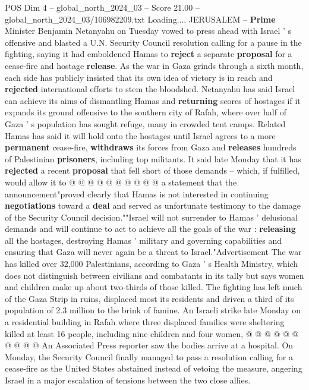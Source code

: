 \begin{textsample}{POS Dim 4 – global\_north\_2024\_03 – Score 21.00 – global\_north\_2024\_03/106982209.txt}  \label{ex:f4_pos_242}
Loading....
JERUSALEM -- \textbf{Prime} Minister Benjamin Netanyahu on Tuesday vowed to press ahead with Israel ' s offensive and blasted a U.N.
Security Council resolution calling for a pause in the fighting, saying it had emboldened Hamas to \textbf{reject} a separate \textbf{proposal} for a cease-fire and hostage \textbf{release}.
As the war in Gaza grinds through a sixth month, each side has publicly insisted that its own idea of victory is in reach and \textbf{rejected} international efforts to stem the bloodshed.
Netanyahu has said Israel can achieve its aims of dismantling Hamas and \textbf{returning} scores of hostages if it expands its ground offensive to the southern city of Rafah, where over half of Gaza ' s population has sought refuge, many in crowded tent camps.
Related Hamas has said it will hold onto the hostages until Israel agrees to a more \textbf{permanent} cease-fire, \textbf{withdraws} its forces from Gaza and \textbf{releases} hundreds of Palestinian \textbf{prisoners}, including top militants.
It said late Monday that it has \textbf{rejected} a recent \textbf{proposal} that fell short of those demands -- which, if fulfilled, would allow it to @ @ @ @ @ @ @ @ @ @ a statement that the announcement"proved clearly that Hamas is not interested in continuing \textbf{negotiations} toward a \textbf{deal} and served as unfortunate testimony to the damage of the Security Council decision.""Israel will not surrender to Hamas ' delusional demands and will continue to act to achieve all the goals of the war : \textbf{releasing} all the hostages, destroying Hamas ' military and governing capabilities and ensuring that Gaza will never again be a threat to Israel."Advertisement The war has killed over 32,000 Palestinians, according to Gaza ' s Health Ministry, which does not distinguish between civilians and combatants in its tally but says women and children make up about two-thirds of those killed.
The fighting has left much of the Gaza Strip in ruins, displaced most its residents and driven a third of its population of 2.3 million to the brink of famine.
An Israeli strike late Monday on a residential building in Rafah where three displaced families were sheltering killed at least 16 people, including nine children and four women, @ @ @ @ @ @ @ @ @ @ An Associated Press reporter saw the bodies arrive at a hospital.
On Monday, the Security Council finally managed to pass a resolution calling for a cease-fire as the United States abstained instead of vetoing the measure, angering Israel in a major escalation of tensions between the two close allies.

\end{textsample}
